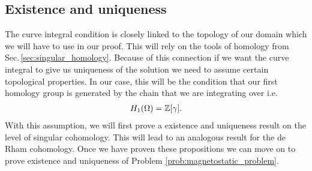 \documentclass[../master_thesis.tex]{subfiles}
\begin{document}
\subsection{Existence and uniqueness}

The curve integral condition is closely linked to the topology of our domain 
which we will have to use in our proof.
This will rely on the tools of homology from Sec.\,\ref{sec:singular_homology}. 
Because of this connection if we want the curve integral
to give us uniqueness of the solution we need to assume certain topological 
properties. In our case, this will be the condition that our first 
homology group is generated by the chain that we are integrating over i.e.
\begin{align*}
    H_1(\Omega) = \mathbb{Z} [\gamma].
\end{align*}
With this assumption, we will first prove a existence and uniqueness result on the 
level of singular cohomology. This will lead to an analogous result for the de Rham 
cohomology. Once we have proven these propositions we can move on to prove existence 
and uniqueness of Problem \ref{prob:magnetostatic_problem}.
\end{document}

